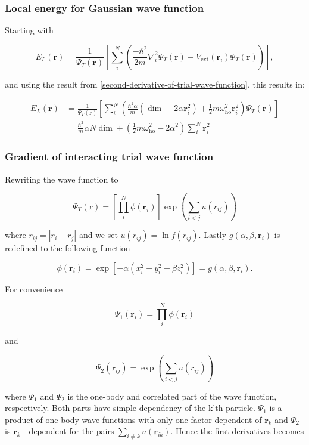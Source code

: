 \documentclass[
]{article}
\begin{document}
\hypertarget{local-energy-for-gaussian-wave-function}{%
\subsubsection{Local energy for Gaussian wave
function}\label{local-energy-for-gaussian-wave-function}}

Starting with

\[
E_L(\mathbf{r}) =
    \frac{1}{\Psi_T(\mathbf{r})} \left[ \sum_i^N \left (\frac{-\hbar^2}{2m}
    \nabla_{i}^2 \Psi_T (\mathbf{r}) + V_\text{ext} ({\mathbf{r}}_i) \Psi_T(\mathbf{r}) \right)  
    \right],
\]

and using the result from
\ref{second-derivative-of-trial-wave-function}, this results in:

\[
\begin{aligned} E_L (\mathbf r) &=  \frac{1}{\Psi_T(\mathbf{r})}  \left[ \sum_i^N \left(  \frac{\hbar^2 \alpha}{m}  (\dim - 2
    \alpha  \mathbf{r}^2_{i} ) + \frac{1}{2} m \omega^2_\text{ho} \mathbf{r}^2_{i} \right) \Psi_T(\mathbf{r}) \right ]\\
&= \frac{\hbar^2 }{m} \alpha N \dim +  \left( \frac{1}{2} m \omega^2_\text{ho} - 2 \alpha^2\right)  \sum_i^N \mathbf{r}^2_{i}
\end{aligned}
\]

\hypertarget{sec:trial_wf_gradient}{%
\subsubsection{Gradient of interacting trial wave
function}\label{sec:trial_wf_gradient}}

Rewriting the wave function to

\[
\Psi_T(\mathbf{r})=\left[
    \prod_i^N \phi(\mathbf{r}_i)
\right]
\exp{\left(\sum_{i<j}u(r_{ij})\right)}
\]

where \(r_{ij} = |r_i - r_j|\) and we set \(u(r_{ij}) = \ln f(r_{ij})\).
Lastly \(g(\alpha, \beta,\mathbf{r}_i)\) is redefined to the following
function

\[
\phi(\mathbf{r}_i) = \exp [-\alpha(x_i^2 + y_i^2 + \beta z_i^2)] = g(\alpha, \beta,\mathbf{r}_i).
\]

For convenience

\[ \Psi_1 (\mathbf{r}_{i})= \prod_i^N \phi(\mathbf{r}_i)\]

and

\[\Psi_2 (\mathbf{r}_ {ij}) = \exp{\left(\sum_{i<j}u(r_{ij})\right)}\]

where \(\Psi_1\) and \(\Psi_2\) is the one-body and correlated part of
the wave function, respectively. Both parts have simple dependency of
the k'th particle. \(\Psi_1\) is a product of one-body wave functions
with only one factor dependent of \(\mathbf{r}_k\) and \(\Psi_2\) is
\(\mathbf{r}_k\) - dependent for the pairs
\(\sum _{i\ne k} u(\mathbf{r} _{ik})\). Hence the first derivatives
becomes
\end{document}
